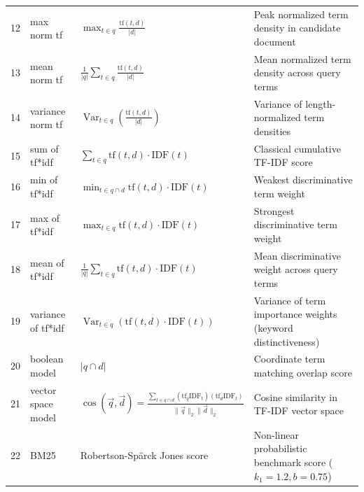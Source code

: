 \documentclass[11pt,a4paper]{article}
\DeclareMathOperator{\Var}{Var}
\begin{document}
\begin{table}[H]
\begin{tabularx}{\textwidth}{rllX}
12 & max norm tf & $\max_{t \in q} \frac{\text{tf}(t, d)}{|d|}$ & Peak normalized term density in candidate document \\
13 & mean norm tf & $\frac{1}{|q|} \sum_{t \in q} \frac{\text{tf}(t, d)}{|d|}$ & Mean normalized term density across query terms \\
14 & variance norm tf & $\Var_{t \in q}\left(\frac{\text{tf}(t, d)}{|d|}\right)$ & Variance of length-normalized term densities \\
15 & sum of tf*idf & $\sum_{t \in q} \text{tf}(t, d) \cdot \text{IDF}(t)$ & Classical cumulative TF-IDF score \\
16 & min of tf*idf & $\min_{t \in q \cap d} \text{tf}(t, d) \cdot \text{IDF}(t)$ & Weakest discriminative term weight \\
17 & max of tf*idf & $\max_{t \in q} \text{tf}(t, d) \cdot \text{IDF}(t)$ & Strongest discriminative term weight \\
18 & mean of tf*idf & $\frac{1}{|q|} \sum_{t \in q} \text{tf}(t, d) \cdot \text{IDF}(t)$ & Mean discriminative weight across query terms \\
19 & variance of tf*idf & $\Var_{t \in q}(\text{tf}(t, d) \cdot \text{IDF}(t))$ & Variance of term importance weights (keyword distinctiveness) \\
20 & boolean model & $|q \cap d|$ & Coordinate term matching overlap score \\
21 & vector space model & $\cos(\vec{q}, \vec{d}) = \frac{\sum_{t \in q \cap d} (\text{tf}_q \text{IDF}_t)(\text{tf}_d \text{IDF}_t)}{\|\vec{q}\|_2 \|\vec{d}\|_2}$ & Cosine similarity in TF-IDF vector space \\
22 & BM25 & Robertson-Sp\"{a}rck Jones score & Non-linear probabilistic benchmark score ($k_1=1.2, b=0.75$) \\
\bottomrule
\end{tabularx}
\end{table}
\end{document}
